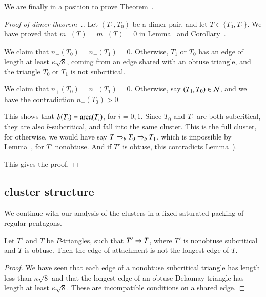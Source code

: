 We are finally in a position to prove Theorem~.

\begin{proof}[Proof of dimer theorem~.]
  Let $(T_1,T_0)$ be a dimer pair, and let $T\in \{T_0,T_1\}$.  We
  have proved that $m_+(T)=m_-(T)=0$ in Lemma~ and
  Corollary~.

  We claim that $n_-(T_0)=n_-(T_1)=0$.  Otherwise, $T_1$ or $T_0$ has
  an edge of length at least $\kappa\sqrt8$, coming from an edge
  shared with an obtuse triangle, and the triangle $T_0$ or $T_1$ is
  not subcritical.

  We claim that $n_+(T_0)=n_+(T_1)=0$.  Otherwise, say
  $(T_1,T_0)\in\mathcal N$, and we have the contradiction $n_-(T_0)>0$.

  This shows that $b(T_i)={\operatorname{area}}(T_i)$, for $i=0,1$.  Since $T_0$ and
  $T_1$ are both subcritical, they are also $b$-subcritical, and fall
  into the same cluster.  This is the full cluster, for otherwise, we
  would have say $T\Rightarrow_{b} T_0\Rightarrow_{b} T_1$, which is impossible by
  Lemma~, for $T'$ nonobtuse.  And if $T'$ is
  obtuse, this contradicts Lemma~).

  This gives the proof.
\end{proof}


\subsection{cluster structure}




We continue with our analysis of the clusters in a fixed saturated
packing of regular pentagons.  

\begin{lemma}  
  Let $T'$ and $T$ be $P$-triangles, such that $T'\Rightarrow T$, where
  $T'$ is nonobtuse subcritical and $T$ is obtuse.  Then the edge
  of attachment is not the longest edge of $T$.
\end{lemma}

\begin{proof} We have seen that each edge of a nonobtuse subcritical
  triangle has length less than $\kappa\sqrt8$ and that the longest
  edge of an obtuse Delaunay triangle has length at least
  $\kappa\sqrt{8}$.  These are incompatible conditions on a shared
  edge.
\end{proof}

